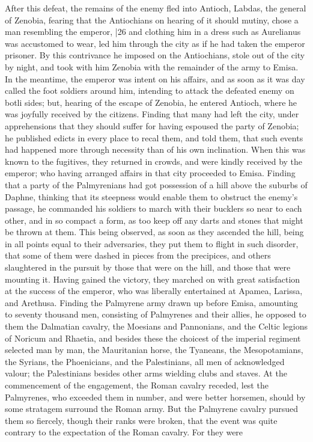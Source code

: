 After this defeat, the remains of the enemy fled into Antioch, Labdas, the general of Zenobia, fearing that the Antiochians on hearing of it should mutiny, chose a man resembling the emperor,
|26 and clothing him in a dress such as Aurelianus was accustomed to wear, led him through the city as if he had taken the emperor prisoner. By this contrivance he imposed on the Antiochians, stole out of the city by night, and took with him Zenobia with the remainder of the army to Emisa. In the meantime, the emperor was intent on his affairs, and as soon as it was day called the foot soldiers around him, intending to attack the defeated enemy on botli sides; but, hearing of the escape of Zenobia, he entered Antioch, where he was joyfully received by the citizens. Finding that many had left the city, under apprehensions that they should suffer for having espoused the party of Zenobia; he published edicts in every place to recal them, and told them, that such events had happened more through necessity than of his own inclination. When this was known to the fugitives, they returned in crowds, and were kindly received by the emperor; who having arranged affairs in that city proceeded to Emisa. Finding that a party of the Palmyrenians had got possession of a hill above the suburbs of Daphne, thinking that its steepness would enable them to obstruct the enemy's passage, he commanded his soldiers to march with their bucklers so near to each other, and in so compact a form, as too keep off any darts and stones that might be thrown at them. This being observed, as soon as they ascended the hill, being in all points equal to their adversaries, they put them to flight in such disorder, that some of them were dashed in pieces from the precipices, and others slaughtered in the pursuit by those that were on the hill, and those that were mounting it. Having gained the victory, they marched on with great satisfaction at the success of the emperor, who was liberally entertained at Apamea, Larissa, and Arethusa. Finding the Palmyrene army drawn up before Emisa, amounting to seventy thousand men, consisting of Palmyrenes and their allies, he opposed to them the Dalmatian cavalry, the Moesians and Pannonians, and the Celtic legions of Noricum and Rhaetia, and besides these the choicest of the imperial regiment selected man by man, the Mauritanian horse, the Tyaneans, the Mesopotamians, the Syrians, the Phoenicians, and the Palestinians, all men of acknowledged valour; the Palestinians besides other arms wielding clubs and staves. At the commencement of the engagement, the Roman cavalry receded, lest the Palmyrenes, who exceeded them in number, and were better horsemen, should by some stratagem surround the Roman army. But the Palmyrene cavalry pursued them so fiercely, though their ranks were broken, that the event was quite contrary to the expectation of the Roman cavalry. For they were
